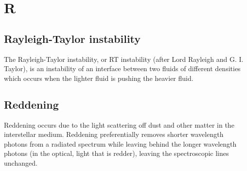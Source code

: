 \documentclass[11pt]{article}
\begin{document}
\section*{R}
\subsection*{Rayleigh-Taylor instability}
The Rayleigh-Taylor instability, or RT instability (after Lord
Rayleigh and G. I. Taylor), is an instability of an interface between
two fluids of different densities which occurs when the lighter fluid
is pushing the heavier fluid.


\subsection*{Reddening}
Reddening occurs due to the light scattering off dust and other matter in the interstellar medium. 
Reddening preferentially removes shorter wavelength photons from a radiated spectrum while leaving behind the longer wavelength photons (in the optical, light that is redder), leaving the spectroscopic lines unchanged.
\end{document}
